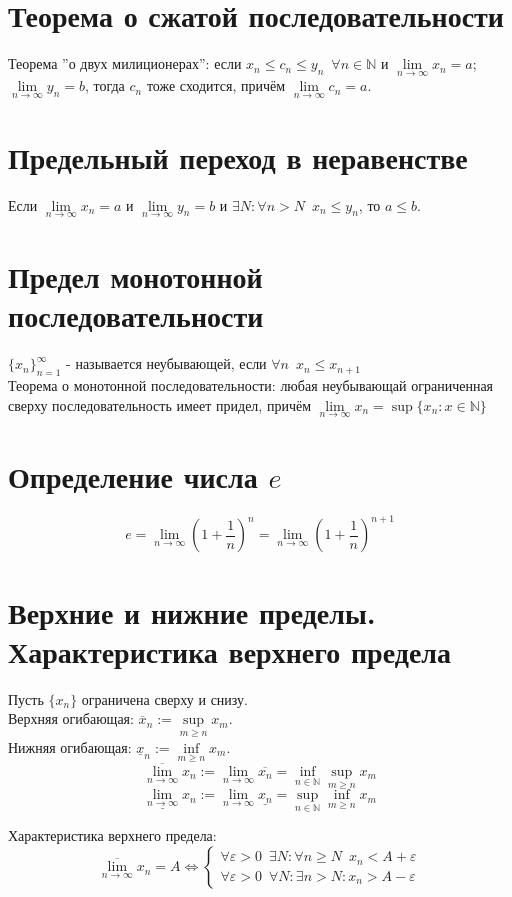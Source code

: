 \documentclass[11pt, a4paper]{article}
\def\N{\mathbb{N}}
\def\sp{\, \, \,}
\def\linf{\lim \limits_{n \to \infty}}
\begin{document}
    \section{Теорема о сжатой последовательности}
    Теорема ''о двух милиционерах'': если $x_n \leq c_n \leq y_n \sp \forall n \in \N$ и $\linf x_n = a$; $\linf y_n = b$, тогда $c_n$ тоже сходится, причём $\linf c_n = a$.

    \section{Предельный переход в неравенстве}
    Если $\linf x_n = a$ и $\linf y_n = b$ и $\exists N: \forall n > N \sp x_n \leq y_n$, то $a \leq b$.
    
    \section{Предел монотонной последовательности}
    $\{x_n\}_{n=1}^{\infty}$ - называется неубывающей, если $\forall n \sp x_n \leq x_{n+1}$\\
    Теорема о монотонной последовательности: любая неубывающай ограниченная сверху последовательность имеет придел, причём $\linf x_n = \sup \{x_n: x \in \N\}$

    \section{Определение числа $e$}
    \[e = \linf \left(1+\frac{1}{n}\right)^n = \linf \left(1+\frac{1}{n}\right)^{n+1}\]

    \section{Верхние и нижние пределы. Характеристика верхнего предела}
    Пусть $\{x_n\}$ ограничена сверху и снизу.\\
    Верхняя огибающая: $\overline{x}_n := \sup \limits_{m \geq n} x_m$.\\
    Нижняя огибающая: $\underline{x}_n := \inf \limits_{m \geq n} x_m$.\\
    \[\overline{\linf} x_n := \linf \overline{x_n} = \inf \limits_{n \in \N} \sup \limits_{m \geq n} x_m\]
    \[\underline{\linf} x_n := \linf \underline{x_n} = \sup \limits_{n \in \N} \inf \limits_{m \geq n} x_m\]

    Характеристика верхнего предела:
    $$\overline{\linf} x_n = A \Leftrightarrow
    \begin{cases}
        \forall \varepsilon > 0 \sp \exists N: \forall n \geq N \sp x_n < A + \varepsilon \\
        \forall \varepsilon > 0 \sp \forall N: \exists n > N: x_n > A - \varepsilon
    \end{cases}$$
\end{document}
